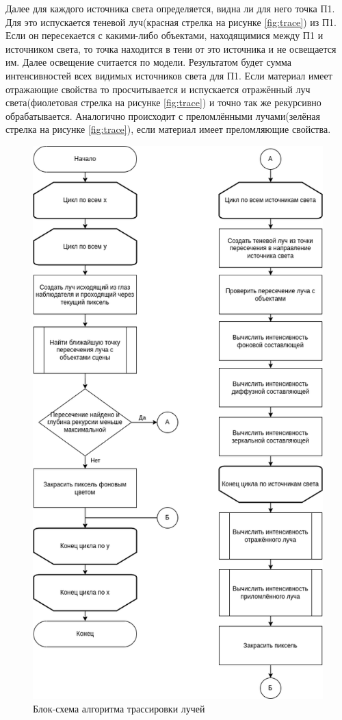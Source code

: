 \documentclass[12pt,a4paper,oneside]{report}
\begin{document}
				Далее для каждого источника света определяется, видна ли для него точка П1. Для это испускается теневой луч(красная стрелка на рисунке \ref{fig:trace}) из П1. Если он пересекается с какими-либо объектами, находящимися между П1 и источником света, то точка находится в тени от это источника и не освещается им. Далее освещение считается по модели. Результатом будет сумма интенсивностей всех видимых источников света для П1. Если материал имеет отражающие свойства то просчитывается и испускается отражённый луч света(фиолетовая стрелка на рисунке \ref{fig:trace}) и точно так же рекурсивно обрабатывается. Аналогично происходит с преломлёнными лучами(зелёная стрелка на рисунке \ref{fig:trace}), если материал имеет преломляющие свойства.
				\begin{figure}[htp]
					\centering
					\includegraphics[scale=0.6]{trace_block}
					\caption{Блок-схема алгоритма трассировки лучей}
				\end{figure}
			\newpage	
\end{document}
